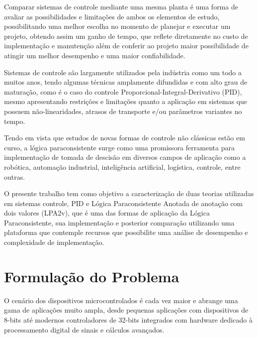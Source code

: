 Comparar sistemas de controle mediante uma mesma planta é uma forma de avaliar as possibilidades e limitações de ambos os elementos de estudo, possibilitando uma melhor escolha no momento de planejar e executar um projeto, obtendo assim um ganho de tempo, que reflete diretamente no custo de implementação e manutenção além de conferir ao projeto maior possibilidade de atingir um melhor desempenho e uma maior confiabilidade. 

Sistemas de controle são largamente utilizados pela indústria como um todo a muitos anos, tendo algumas técnicas amplamente difundidas e com alto grau de maturação, como é o caso do controle Proporcional-Integral-Derivativo (PID),  mesmo apresentando restrições e limitações quanto a aplicação em sistemas que possuem não-linearidades, atrasos de transporte e/ou parâmetros variantes no tempo.\cite{Ferreira2012}



Tendo em vista que estudos de novas formas de controle não clássicas estão em curso, a lógica paraconsistente surge como uma promissora ferramenta para implementação de tomada de descisão em diversos campos de aplicação como a robótica, automação industrial, inteligência artificial, logística, controle, entre outras.\cite{JoaoInacio}
 
O presente trabalho tem como objetivo a caracterização de duas teorias utilizadas em sistemas controle, PID e Lógica Paraconsistente Anotada de anotação com dois valores (LPA2v), que é uma das formas de aplicação da Lógica Paraconsistente, sua implementação e posterior comparação utilizando uma plataforma que contemple recursos que possibilite uma análise de desempenho e complexidade de implementação.



\section{Formulação do Problema}

O cenário dos dispositivos microcontrolados é cada vez maior e abrange uma gama de aplicações muito ampla, desde pequenas aplicações com dispositivos de 8-bits até modernos controladores de 32-bits integrados com hardware dedicado à processamento digital de sinais e cálculos avançados.


